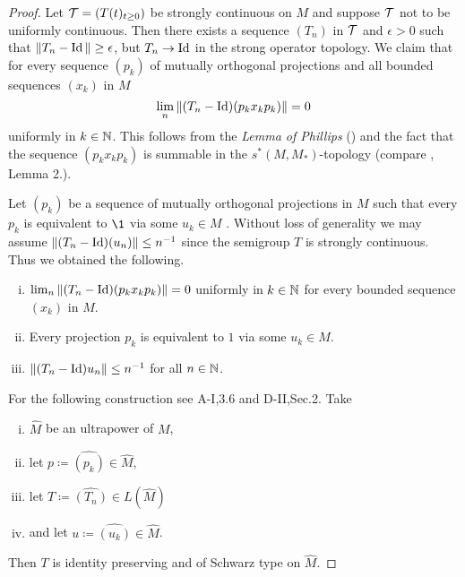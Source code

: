 \begin{proof}
Let $\mathcal{T} = (T(t)_{t \geq 0})$ be strongly continuous on $M$ and suppose $\mathcal{T}$ not to be uniformly continuous.
Then there exists a sequence $(T_n)$  in  $ \mathcal{T} $ and $\epsilon > 0$ such that $\|T_n - \operatorname{Id}\| \geq \epsilon$, 
but $T_n \to \operatorname{Id}$ in the strong operator topology.
We claim that for every sequence $(p_{k})$ of mutually orthogonal projections and all bounded sequences $(x_{k})$ 
in $M$
\[
\lim_n \|(T_n - \operatorname{Id})(p_{k} x_{k} p_{k})\| = 0
\]
uniformly in $k \in \mathbb{N}$.
This follows from the \emph{Lemma of Phillips} (\citet{schaefer:1974}) and the fact that the sequence $(p_{k} x_{k} p_{k})$ is summable in the $s^{*}(M,M_*)$-topology (compare \citet{elliot:1972}, Lemma 2.).

Let $(p_{k})$ be a sequence of mutually orthogonal projections in $M$ such that every $p_{k}$ is equivalent to $\1$ via some $u_{k} \in M$ \cite[2.2]{sakai:1971}.
Without loss of generality we may assume $\|(T_n - \operatorname{Id})(u_n)\| \leq n^{-1}$ since the semigroup $T$ is strongly continuous.
Thus we obtained the following.
\begin{enumerate}[(i)]
\item 
$\lim_n \|(T_n - \operatorname{Id})(p_{k} x_{k} p_{k})\| = 0$ uniformly in $k \in \mathbb{N}$ for every bounded sequence $(x_{k})$ in $M$.
\item 
Every projection $p_{k}$ is equivalent to $1$ via some $u_{k} \in M$.
\item 
$\|(T_n - \operatorname{Id})u_n\| \leq n^{-1}$ for all $n \in \mathbb{N}$.
\end{enumerate}
For the following construction see A-I,3.6 and D-II,Sec.2.
Take
\begin{enumerate}[(i)]
\item
$\widehat{M}$ be an ultrapower of $M$,

\item
let $p \coloneq \widehat{(p_{k})} \in \widehat{M}$,

\item
let $T \coloneq \widehat{(T_{n}) }\in L(\widehat{M})$

\item
and let $u \coloneq \widehat{(u_{k})}  \in \widehat{M}$.

\end{enumerate}
Then $T$ is identity preserving and of Schwarz type on $\widehat{M}$.


\end{proof}
